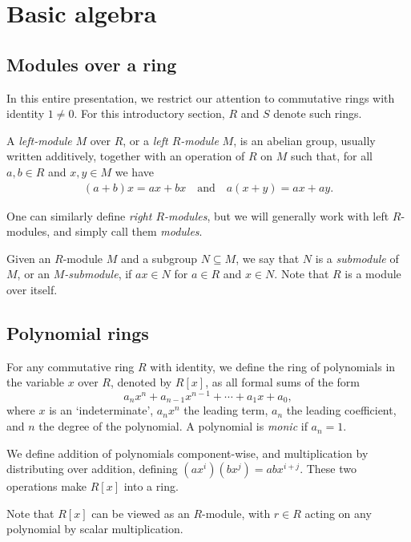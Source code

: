 \section{Basic algebra}


\subsection{Modules over a ring}

In this entire presentation, we restrict our attention to commutative rings with identity $1\neq 0$. For this introductory section, $R$ and $S$ denote such rings.

\begin{defn}
	A \emph{left-module} $M$ over $R$, or a \emph{left $R$-module} $M$, is an abelian group, usually written additively, together with an operation of $R$ on $M$ such that, for all $a,b\in R$ and $x,y\in M$ we have
	\begin{align*}
		(a+b)x = ax+bx \quad \text{and} \quad a(x+y)=ax+ay.
	\end{align*}
\end{defn}

One can similarly define \emph{right $R$-modules}, but we will generally work with left $R$-modules, and simply call them \emph{modules}.

Given an $R$-module $M$ and a subgroup $N\subseteq M$, we say that $N$ is a \emph{submodule} of $M$, or an \emph{$M$-submodule}, if $ax\in N$ for $a\in R$ and $x\in N$. Note that $R$ is a module over itself.


\subsection{Polynomial rings}

For any commutative ring $R$ with identity, we define the ring of polynomials in the variable $x$ over $R$, denoted by $R[x]$, as all formal sums of the form
\[
	a_nx^n+a_{n-1}x^{n-1}+\cdots + a_1x + a_0,
\]
where $x$ is an `indeterminate', $a_nx^n$ the leading term, $a_n$ the leading coefficient, and $n$ the degree of the polynomial. A polynomial is \emph{monic} if $a_n=1$.

We define addition of polynomials component-wise, and multiplication by distributing over addition, defining $(ax^i)(bx^j)=abx^{i+j}$. These two operations make $R[x]$ into a ring.

Note that $R[x]$ can be viewed as an $R$-module, with $r\in R$ acting on any polynomial by scalar multiplication.


